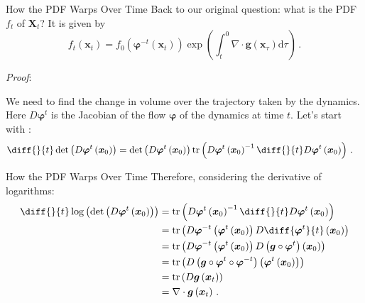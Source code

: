 \documentclass[10pt]{beamer}
\DeclareMathOperator{\tr}{tr}
\begin{document}
\begin{frame}[fragile]{How the PDF Warps Over Time}
Back to our original question: what is the PDF \(f_t\) of \(\bm{X}_t\)? It is given by
\begin{equation*}
    f_t\left(\bm{x}_t\right) = f_0\left(\bm{\varphi}^{-t}\left(\bm{x}_t\right)\right)\exp\left(\int_t^0 \nabla\cdot\bm{g}\left(\bm{x}_\tau\right)\mathrm{d}\tau\right)\,.
\end{equation*}

\textit{Proof}:

We need to find the change in volume over the trajectory taken by the dynamics. Here \(D\bm{\varphi}^t\) is the Jacobian of the flow \(\bm{\varphi}\) of the dynamics at time \(t\). Let's start with \href{https://en.wikipedia.org/wiki/Jacobi\%27s_formula}{\color{mLightBrown}{Jacobi's formula}}:
\begin{equation*}\begin{aligned}
    \diff{}{t}\det\left(D\bm{\varphi}^t\left(\bm{x}_0\right)\right) &= \det\left(D\bm{\varphi}^t\left(\bm{x}_0\right)\right) \tr\left(D\bm{\varphi}^t\left(\bm{x}_0\right)^{-1} \diff{}{t}D\bm{\varphi}^t\left(\bm{x}_0\right)\right)\,.
\end{aligned}\end{equation*}
\end{frame}

\begin{frame}[fragile]{How the PDF Warps Over Time}
Therefore, considering the derivative of logarithms:
\begin{equation*}\begin{aligned}
    \diff{}{t}\log\left(\det\left(D\bm{\varphi}^t\left(\bm{x}_0\right)\right)\right) &= \tr\left(D\bm{\varphi}^t\left(\bm{x}_0\right)^{-1} \diff{}{t}D\bm{\varphi}^t\left(\bm{x}_0\right)\right)\\
    &= \tr\left(D\bm{\varphi}^{-t}\left(\bm{\varphi}^t\left(\bm{x}_0\right)\right) D\diff{\bm{\varphi}^t}{t}\left(\bm{x}_0\right)\right)\\
    &= \tr\left(D\bm{\varphi}^{-t}\left(\bm{\varphi}^t\left(\bm{x}_0\right)\right) D\left(\bm{g}\circ\bm{\varphi}^t\right)\left(\bm{x}_0\right)\right)\\
    &= \tr\left(D\left(\bm{g}\circ\bm{\varphi}^t\circ\bm{\varphi}^{-t}\right)\left(\bm{\varphi}^t\left(\bm{x}_0\right)\right)\right)\\
    &= \tr\left(D\bm{g}\left(\bm{x}_t\right)\right)\\
    &= \nabla\cdot \bm{g}\left(\bm{x}_t\right)\,.
\end{aligned}\end{equation*}
\end{frame}
\end{document}
